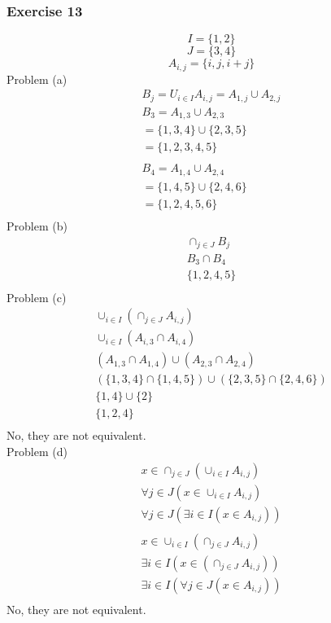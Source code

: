 \begin{questions}
\subsubsection{Exercise 13}
$$ I = \{1,2\} $$
$$ J = \{3,4\} $$
$$ A_{i,j} = \{i, j, i+j\} $$
Problem (a)
\begin{align}
  B_j = U_{i \in I}A_{i,j} = A_{1,j} \cup A_{2,j} \\
  B_3 = A_{1,3} \cup A_{2,3} \\
  = \{ 1,3,4 \} \cup \{ 2,3,5 \} \\
  = \{1,2,3,4,5\} \\ \\
  B_4 = A_{1,4} \cup A_{2,4} \\
  = \{1,4,5\} \cup \{2,4,6\} \\
  = \{1,2,4,5,6\} \\
\end{align}
Problem (b)
\begin{align*}
  \cap_{j \in J}B_j \\
  B_3 \cap B_4 \\
  \{1,2,4,5\} \\
\end{align*}
Problem (c)
\begin{align*}
  \cup_{i \in I}(\cap_{j \in J}A_{i,j}) \\
  \cup_{i \in I}(A_{i,3} \cap A_{i,4}) \\
  (A_{1,3} \cap A_{1,4}) \cup (A_{2,3} \cap A_{2,4}) \\
  (\{1,3,4\} \cap \{1,4,5\}) \cup (\{2,3,5\} \cap \{2,4,6\}) \\
  \{1,4\} \cup \{2\} \\
  \{1,2,4\} \\
\end{align*}
No, they are not equivalent. \\
Problem (d)
\begin{align*}
  x \in \cap_{j \in J}(\cup_{i \in I}A_{i,j}) \\
  \forall j \in J(x \in \cup_{i \in I}A_{i,j})\\
  \forall j \in J(\exists i \in I(x \in A_{i,j}))\\ \\
  x \in \cup_{i \in I}(\cap_{j \in J}A_{i,j}) \\
  \exists i \in I(x \in (\cap_{j \in J}A_{i,j})) \\
  \exists i \in I(\forall j \in J(x \in A_{i,j}))\\
\end{align*}
  No, they are not equivalent.

\end{questions}
